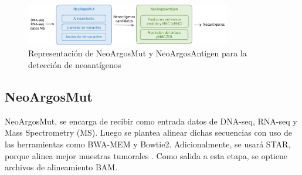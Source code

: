 \documentclass[a4paper,11pt]{article}
\begin{document}
\begin{figure}[h]	
		\centering
		\includegraphics[width=0.8\textwidth]{../img/pipeline/proposal_pipeline}	
	\caption{Representación de NeoArgosMut y NeoArgosAntigen para la detección de neoantígenos}
	\label{fig:pipeline}
\end{figure}


\subsection{NeoArgosMut}


NeoArgosMut, se encarga de recibir como entrada datos de DNA-seq, RNA-seq y Mass Spectrometry (MS). Luego se plantea alinear dichas secuencias con uso de las herramientas como BWA-MEM y Bowtie2. Adicionalmente, se usará STAR, porque alinea mejor muestras tumorales \citep{rubinsteyn2018computational}. Como salida a esta etapa, se optiene archivos de alineamiento BAM.


\end{document}
